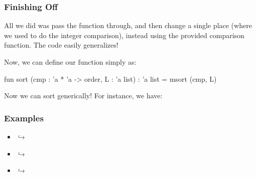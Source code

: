 \documentclass[aspectratio=169]{beamer}
\begin{document}
\begin{frame}[fragile]
  \frametitle{Finishing Off }


  All we did was pass the  function through, and then change a
  single place (where we used to do the integer comparison), instead using
  the provided comparison function. The code easily generalizes!

  \vspace{\fill}

  Now, we can define our  function simply as:

  \pause
  \vspace{\fill}

  \begin{codeblock}
    fun sort (cmp : 'a * 'a -> order, L : 'a list) : 'a list = msort (cmp, L)
  \end{codeblock}

  \pause
  \vspace{\fill}

  Now we can sort generically! For instance, we have:
\end{frame}

\begin{frame}[fragile]
  \frametitle{ Examples}

  \begin{itemize}
    \item {} $\hookrightarrow$ \code{[1, 2, 3]}
    \item {} $\hookrightarrow$ \code{["a", "b", "ab"]}
    \item {} $\hookrightarrow$ \code{[3, 2, 1]}
  \end{itemize}
\end{frame}



\thankyou

\end{document}
